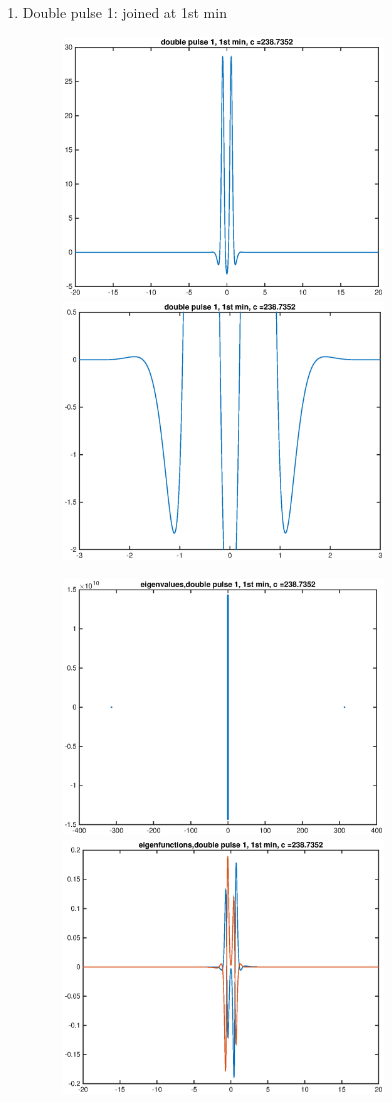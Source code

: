 \documentclass[12pt]{article}
\begin{document}
\begin{enumerate}
	\item Double pulse 1: joined at 1st min
	\begin{figure}[H]
	\includegraphics[width=8.5cm]{1double1.eps}
	\includegraphics[width=8.5cm]{1double1zoom.eps}
	\end{figure}
	\begin{figure}[H]
	\includegraphics[width=8.5cm]{1double1eig.eps}
	\includegraphics[width=8.5cm]{1double1eigfn.eps}
	\end{figure}


\end{enumerate}
\end{document}
